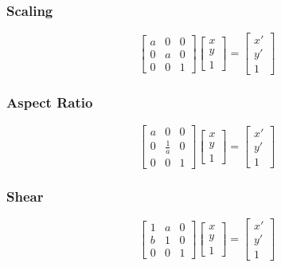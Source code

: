 \subsubsection{Scaling}
\begin{equation}
    \begin{bmatrix}
    a & 0 & 0 \\
    0 & a & 0 \\
    0 & 0 & 1
    \end{bmatrix}
    \begin{bmatrix}
    x \\ y \\ 1
    \end{bmatrix}
    =
    \begin{bmatrix}
    x' \\
    y' \\
    1
    \end{bmatrix}
\end{equation}

\subsubsection{Aspect Ratio}

\begin{equation}
    \begin{bmatrix}
        a & 0 & 0 \\
        0 & \frac{1}{a} & 0 \\
        0 & 0 & 1
\end{bmatrix}
    \begin{bmatrix}
    x \\ y \\ 1
    \end{bmatrix}
    =
    \begin{bmatrix}
    x' \\
    y' \\
    1
    \end{bmatrix}
\end{equation}

\subsubsection{Shear}

\begin{equation}
    \begin{bmatrix}
        1 & a & 0 \\
        b & 1 & 0 \\
        0 & 0 & 1
\end{bmatrix}
    \begin{bmatrix}
    x \\ y \\ 1
    \end{bmatrix}
    =
    \begin{bmatrix}
    x' \\
    y' \\
    1
    \end{bmatrix}
\end{equation}

